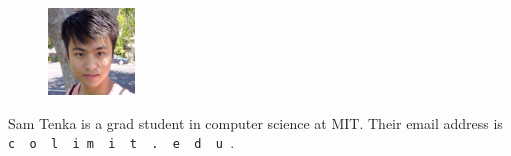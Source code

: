 \documentclass[twocolumn, 11pt]{article}
\theoremstyle{definition}
\begin{document}
        \hrulefill
        \vspace{0.1cm}
            \begin{figure}
                \vspace{-0.4cm}
                    \includegraphics[height=2.3cm]{sam}
            \end{figure}
        \normalsize
        Sam Tenka is a grad student in computer science 
        at MIT.  Their email address is
        \texttt{
            c{\tiny\ }%
            o{\tiny\ }%
            l{\tiny\ }%
            i{\tiny@}%
            m{\tiny\ }%
            i{\tiny\ }%
            t{\tiny\ }%
            .{\tiny\ }%
            e{\tiny\ }%
            d{\tiny\ }%
            u%
        }.
\end{document}

